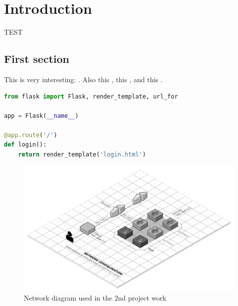 \chapter{Introduction}

TEST

\section{First section}

This is very interesting: \cite{coulouris}. Also this \cite{donoho}, this \cite{ictbusiness}, and this \cite{dalal}.

\begin{code}[Implementation]
    \begin{lstlisting}[language=Python]
from flask import Flask, render_template, url_for

app = Flask(__name__)

@app.route('/')
def login():
    return render_template('login.html')
    \end{lstlisting}
\end{code}

\begin{figure}
    \centering
    \includegraphics[scale=0.25]{figures/DNCS-2.png}
    \caption{Network diagram used in the 2nd project work}
\end{figure}